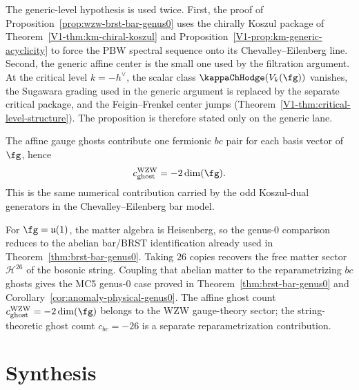 \begin{remark}
\label{rem:wzw-brst-bar-generic-level}
The generic-level hypothesis is used twice. First, the proof of
Proposition~\ref{prop:wzw-brst-bar-genus0} uses the chirally Koszul
package of Theorem~\ref{V1-thm:km-chiral-koszul} and
Proposition~\ref{V1-prop:km-generic-acyclicity} to force the PBW
spectral sequence onto its Chevalley--Eilenberg line. Second, the
generic affine center is the small one used by the filtration
argument. At the critical level $k=-h^\vee$, the scalar class
$\kappaChHodge(V_k(\fg))$ vanishes, the Sugawara grading used in the generic
argument is replaced by the separate critical package, and the
Feigin--Frenkel center jumps
\textup{(}Theorem~\ref{V1-thm:critical-level-structure}\textup{)}.
The proposition is therefore stated only on the generic lane.

The affine gauge ghosts contribute one fermionic $bc$ pair for each
basis vector of~$\fg$, hence
\[
 c_{\mathrm{ghost}}^{\mathrm{WZW}} = -2\dim(\fg).
\]
This is the same numerical contribution carried by the odd
Koszul-dual generators in the Chevalley--Eilenberg bar model.

For $\fg = \mathfrak{u}(1)$, the matter algebra is Heisenberg, so the
genus-$0$ comparison reduces to the abelian bar/BRST identification
already used in Theorem~\ref{thm:brst-bar-genus0}. Taking $26$
copies recovers the free matter sector $\mathcal{H}^{26}$ of the
bosonic string. Coupling that abelian matter to the reparametrizing
$bc$ ghosts gives the MC5 genus-$0$ case proved in
Theorem~\ref{thm:brst-bar-genus0} and
Corollary~\ref{cor:anomaly-physical-genus0}. The affine ghost count
$c_{\mathrm{ghost}}^{\mathrm{WZW}} = -2\dim(\fg)$ belongs to the WZW
gauge-theory sector; the string-theoretic ghost count
$c_{bc} = -26$ is a separate reparametrization contribution.
\end{remark}

\section{Synthesis}
\label{sec:vol2-bvbrst-supplement}

